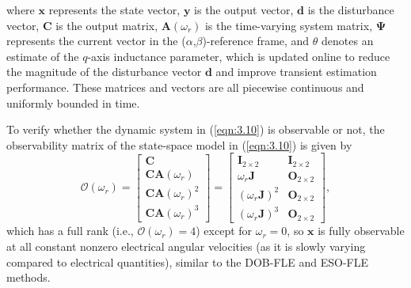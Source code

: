 where \( \mathbf{x} \) represents the state vector, \( \mathbf{y} \) is the output vector, \( \mathbf{d} \) is the disturbance vector, \( \mathbf{C} \) is the output matrix, \( \mathbf{A}(\omega_r) \) is the time-varying system matrix, \(\mathbf{\Psi}\) represents the current vector in the ($\alpha$,$\beta$)-reference frame, and \(\theta\) denotes an estimate of the $q$-axis inductance parameter, which is updated online to reduce the magnitude of the disturbance vector \(\mathbf{d}\) and improve transient estimation performance. These matrices and vectors are all piecewise continuous and uniformly bounded in time.

To verify whether the dynamic system in (\ref{eqn:3.10}) is observable or not, the observability matrix of the state-space model in (\ref{eqn:3.10}) is given by
\begin{equation}\label{eqn:3.12}
\mathcal{O}(\omega_r) = \begin{bmatrix}
\mathbf{C} \\
\mathbf{C}\mathbf{A}(\omega_r) \\
\mathbf{C}\mathbf{A}(\omega_r)^2 \\
\mathbf{C}\mathbf{A}(\omega_r)^3
\end{bmatrix} = \begin{bmatrix}
\mathbf{I}_{2\times2}& \mathbf{I}_{2\times2} \\
\omega_r \mathbf{J} & \mathbf{O}_{2\times2} \\
(\omega_r \mathbf{J})^2 & \mathbf{O}_{2\times2} \\
(\omega_r \mathbf{J})^3 & \mathbf{O}_{2\times2}
\end{bmatrix},  
\end{equation}
which has a full rank (i.e., \(\mathcal{O}(\omega_r) = 4\)) except for \(\omega_r = 0\), so \(\mathbf{x}\) is fully observable at all constant nonzero electrical angular velocities (as it is slowly varying compared to electrical quantities), similar to the DOB-FLE and ESO-FLE methods. 

